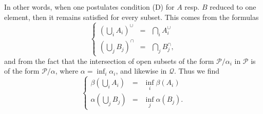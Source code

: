 \documentclass[11pt]{article}
\begin{document}
In other words, when one postulates condition (D) for $A$ resp. $B$ reduced to one element, then it remains satisfied for every subset. This comes from the formulas
\[
\left\{
\begin{array}{lcl}
(\bigcup_i A_i)^\cup & = & \bigcap_i A_i^\cup \\[1ex]
(\bigcup_j B_j)^\cap & = & \bigcap_j B_j^\cap,
\end{array}
\right.
\tag*{(5.2)}
\]
and from the fact that the intersection of open subsets of the form $\mathcal{P}/\alpha_i$ in $\mathcal{P}$ is of the form $\mathcal{P}/\alpha$, where $\alpha = \inf_i \alpha_i$, and likewise in $\mathcal{Q}$. Thus we find
\[
\left\{
\begin{array}{lcl}
\beta(\bigcup_i A_i) & = & \inf_i \beta(A_i) \\[1ex]
\alpha(\bigcup_j B_j) & = & \inf_j \alpha(B_j).
\end{array}
\right.
\tag*{(5.3)}
\]
\end{document}
